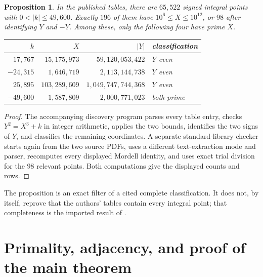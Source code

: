 \documentclass[11pt]{amsart}
\newtheorem{proposition}[theorem]{Proposition}
\theoremstyle{remark}
\begin{document}
\begin{proposition}\label{prop:filter}
In the published tables, there are $65{,}522$ signed integral points with
$0<|k|\le49{,}600$.  Exactly $196$ of them have
$10^6\le X\le10^{12}$, or $98$ after identifying $Y$ and $-Y$.
Among these, only the following four have prime $X$.
\begin{center}
\begin{tabular}{rrrl}
\toprule
$k$ & $X$ & $|Y|$ & classification \\
\midrule
$ 17{,}767$ & $15{,}175{,}973$ & $59{,}120{,}053{,}422$ & $Y$ even \\
$-24{,}315$ & $ 1{,}646{,}719$ & $ 2{,}113{,}144{,}738$ & $Y$ even \\
$ 25{,}895$ & $103{,}289{,}609$ & $1{,}049{,}747{,}744{,}368$ & $Y$ even \\
$-49{,}600$ & $ 1{,}587{,}809$ & $ 2{,}000{,}771{,}023$ & both prime \\
\bottomrule
\end{tabular}
\end{center}
\end{proposition}

\begin{proof}
The accompanying discovery program parses every table entry, checks
$Y^2=X^3+k$ in integer arithmetic, applies the two bounds, identifies the
two signs of $Y$, and classifies the remaining coordinates.  A separate
standard-library checker starts again from the two source PDFs, uses a
different text-extraction mode and parser, recomputes every displayed
Mordell identity, and uses exact trial division for the $98$ relevant
points.  Both computations give the displayed counts and rows.
\end{proof}

The proposition is an exact filter of a cited complete classification.  It
does not, by itself, reprove that the authors' tables contain every integral
point; that completeness is the imported result of
\cite{BennettGhadermarzi2015}.

\section{Primality, adjacency, and proof of the main theorem}
\end{document}
